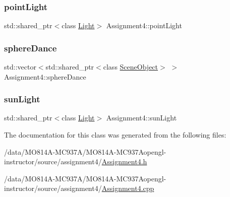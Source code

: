 \subsubsection{\texorpdfstring{point\+Light}{pointLight}}
{\footnotesize\ttfamily std\+::shared\+\_\+ptr$<$class \hyperlink{class_light}{Light}$>$ Assignment4\+::point\+Light\hspace{0.3cm}{\ttfamily [private]}}

\hypertarget{class_assignment4_aa16802895aa2aef461d130479c81a015}{}\label{class_assignment4_aa16802895aa2aef461d130479c81a015}
\subsubsection{\texorpdfstring{sphere\+Dance}{sphereDance}}
{\footnotesize\ttfamily std\+::vector$<$std\+::shared\+\_\+ptr$<$class \hyperlink{class_scene_object}{Scene\+Object}$>$ $>$ Assignment4\+::sphere\+Dance\hspace{0.3cm}{\ttfamily [private]}}

\hypertarget{class_assignment4_ab2981232ba58193de1682308a1dbafdc}{}\label{class_assignment4_ab2981232ba58193de1682308a1dbafdc}
\subsubsection{\texorpdfstring{sun\+Light}{sunLight}}
{\footnotesize\ttfamily std\+::shared\+\_\+ptr$<$class \hyperlink{class_light}{Light}$>$ Assignment4\+::sun\+Light\hspace{0.3cm}{\ttfamily [private]}}



The documentation for this class was generated from the following files\+:\begin{DoxyCompactItemize}
\item
/data/MO814A-MC937A/MO814A-MC937Aopengl-\/instructor/source/assignment4/\hyperlink{_assignment4_8h}{Assignment4.\+h}\item
/data/MO814A-MC937A/MO814A-MC937Aopengl-\/instructor/source/assignment4/\hyperlink{_assignment4_8cpp}{Assignment4.\+cpp}\end{DoxyCompactItemize}
